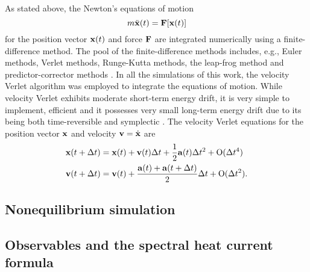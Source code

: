 As stated above, the Newton's equations of motion 
\begin{equation}
 m \ddot{\mathbf{x}}(t) = \mathbf{F}[\mathbf{x}(t)]
\end{equation}
for the position vector $\mathbf{x}(t)$ and force $\mathbf{F}$ are integrated numerically using a finite-difference method. The pool of the finite-difference methods includes, e.g., Euler methods, Verlet methods, Runge-Kutta methods, the leap-frog method and predictor-corrector methods \cite{}. In all the simulations of this work, the velocity Verlet algorithm was employed to integrate the equations of motion. While velocity Verlet exhibits moderate short-term energy drift, it is very simple to implement, efficient and it possesses very small long-term energy drift due to its being both time-reversible and symplectic \cite{}. The velocity Verlet equations for the position vector $\mathbf{x}$ and velocity $\mathbf{v}=\dot{\mathbf{x}}$ are
\begin{alignat}{2}
  \mathbf{x}(t+\Delta t) &= \mathbf{x}(t) + \mathbf{v}(t)\Delta t+  \frac{1}{2}\mathbf{a}(t) \Delta t^2 + \mathrm{O}(\Delta t^4) \\
  \mathbf{v}(t+\Delta t) &= \mathbf{v}(t) + \frac{ \mathbf{a}(t)+\mathbf{a}(t+\Delta t)}{2} \Delta t+ \mathrm{O}(\Delta t^2) .
\end{alignat}




\subsection{Nonequilibrium simulation}

\subsection{Observables and the spectral heat current formula}

